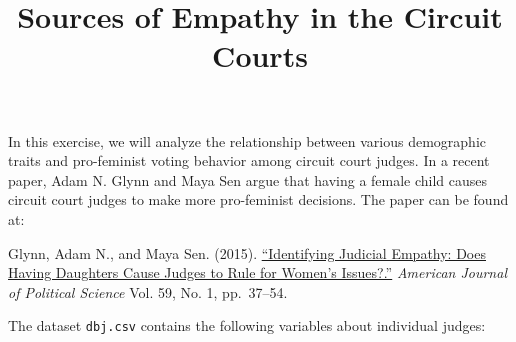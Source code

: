 \documentclass[]{article}
\title{Sources of Empathy in the Circuit Courts}
\author{}
\date{}
\begin{document}
\maketitle


In this exercise, we will analyze the relationship between various
demographic traits and pro-feminist voting behavior among circuit court
judges. In a recent paper, Adam N. Glynn and Maya Sen argue that having
a female child causes circuit court judges to make more pro-feminist
decisions. The paper can be found at:

Glynn, Adam N., and Maya Sen. (2015).
\href{https://doi.org/10.1111/ajps.12118}{``Identifying Judicial
Empathy: Does Having Daughters Cause Judges to Rule for Women's
Issues?.''} \emph{American Journal of Political Science} Vol. 59, No. 1,
pp.~37--54.

The dataset \texttt{dbj.csv} contains the following variables about
individual judges:
\end{document}
